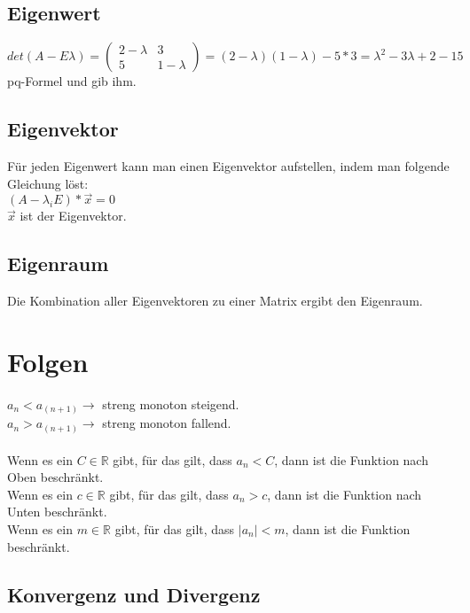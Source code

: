 \documentclass[a4paper,landscape, 11pt]{article}
\begin{document}
\begin{multicols}{4}
\begin{small}
        \subsection{Eigenwert}
        $det(A - E\lambda) = 
        \left(
        \begin{matrix}
            2-\lambda & 3 \\
            5 & 1-\lambda
        \end{matrix}
        \right) = (2-\lambda)(1-\lambda) - 5*3 = \lambda^2 - 3\lambda  + 2 - 15$\\
        pq-Formel und gib ihm. 
        
        \subsection{Eigenvektor}
        Für jeden Eigenwert kann man einen Eigenvektor aufstellen, indem man folgende Gleichung löst: \\
        $ (A - \lambda_iE)*\vec{x} = 0$\\
        $\vec{x}$ ist der Eigenvektor.
        
        \subsection{Eigenraum}
        Die Kombination aller Eigenvektoren zu einer Matrix ergibt den Eigenraum.
    \section{Folgen}
    $a_n < a_(n+1) \rightarrow$ streng monoton steigend. \\
    $a_n > a_(n+1) \rightarrow$ streng monoton fallend. \\ 
    \\ 
    Wenn es ein $C \in \mathbb{R}$ gibt, für das gilt, dass $a_n < C$, dann ist die Funktion nach Oben beschränkt. \\
    Wenn es ein $c \in \mathbb{R}$ gibt, für das gilt, dass $a_n > c$, dann ist die Funktion nach Unten beschränkt. \\
    Wenn es ein $m \in \mathbb{R}$ gibt, für das gilt, dass $ | a_n | < m$, dann ist die Funktion beschränkt.
        
        \subsection{Konvergenz und Divergenz}
            

\end{small}
\end{multicols}
\end{document}

